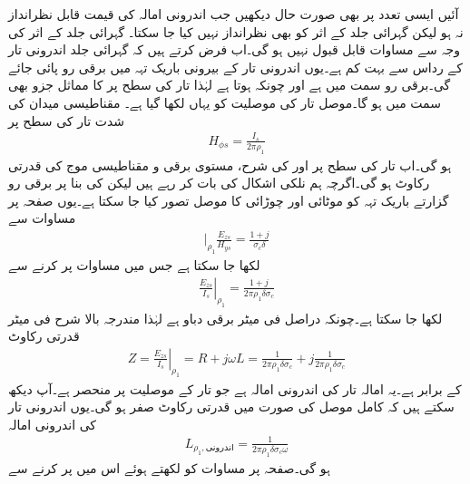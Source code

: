 آئیں ایسی تعدد پر بھی صورت حال دیکھیں جب اندرونی امالہ کی قیمت قابل نظرانداز نہ ہو لیکن گہرائی جلد کے اثر کو بھی نظرانداز نہیں کیا جا سکتا۔ گہرائی جلد کے اثر کی وجہ سے مساوات  قابل قبول نہیں ہو گی۔اب فرض کرتے ہیں کہ گہرائی جلد  اندرونی تار کے رداس  سے بہت کم ہے۔یوں اندرونی تار کے بیرونی باریک تہہ میں برقی رو پائی جائے گی۔برقی رو  سمت میں ہے اور چونکہ  ہوتا ہے لہٰذا تار کی سطح پر  کا مماثل جزو بھی  سمت میں ہو گا۔موصل تار کی موصلیت کو یہاں  لکھا گیا ہے۔ مقناطیسی میدان کی شدت تار کی سطح پر 
\begin{align}\label{مساوات_ترسیلی_ہم_محوری_تار_اندرونی_تار_مقناطیسی_میدان}
H_{\phi s}=\frac{I_s}{2\pi \rho_1}
\end{align}
ہو گی۔اب تار کی سطح پر  اور  کی شرح، مستوی برقی و مقناطیسی موج کی  قدرتی رکاوٹ ہو گی۔اگرچہ ہم نلکی اشکال کی بات کر رہے ہیں لیکن  کی بنا پر برقی رو گزارتے باریک تہہ کو  موٹائی اور  چوڑائی کا موصل تصور کیا جا سکتا ہے۔یوں صفحہ  پر مساوات  سے
\begin{align*}
\left. \right|_{\rho_1}\frac{E_{zs}}{H_{ys}}=\frac{1+j}{\sigma_c \delta}
\end{align*}
لکھا جا سکتا ہے جس میں مساوات  پر کرنے سے
\begin{align*}
\left. \frac{E_{zs}}{I_s} \right|_{\rho_1} =\frac{1+j}{2\pi \rho_1 \delta \sigma_c }
\end{align*}
لکھا جا سکتا ہے۔چونکہ  دراصل فی میٹر برقی دباو ہے لہٰذا مندرجہ بالا شرح فی میٹر قدرتی رکاوٹ
\begin{align}\label{مساوات_ترسیلی_رکاوٹ_بلند_تعدد_ہم_محوری}
Z=\left. \frac{E_{zs}}{I_s} \right|_{\rho_1}=R+j \omega L=\frac{1}{2\pi \rho_1 \delta \sigma_c }+j \frac{1}{2\pi \rho_1 \delta \sigma_c }
\end{align}
 کے برابر ہے۔یہ امالہ تار کی اندرونی امالہ ہے جو تار کے موصلیت  پر منحصر ہے۔آپ دیکھ سکتے ہیں کہ کامل موصل کی صورت میں قدرتی رکاوٹ صفر ہو گی۔یوں اندرونی تار کی اندرونی امالہ
\begin{align*}
L_{\rho_1,\text{اندرونی}}=\frac{1}{2\pi \rho_1 \delta \sigma_c \omega}
\end{align*}
ہو گی۔صفحہ  پر مساوات  کو  لکھتے ہوئے اس میں پر کرنے سے

